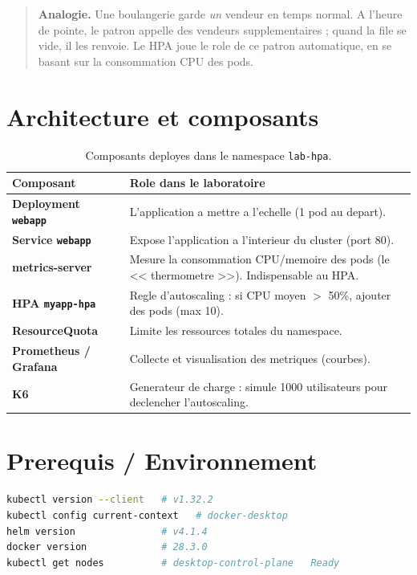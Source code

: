 \documentclass[11pt,a4paper]{report}
\begin{document}
\begin{quote}
\textbf{Analogie.} Une boulangerie garde \emph{un} vendeur en temps normal. A l'heure de
pointe, le patron appelle des vendeurs supplementaires ; quand la file se vide, il les
renvoie. Le HPA joue le role de ce patron automatique, en se basant sur la consommation
CPU des pods.
\end{quote}

\section{Architecture et composants}

\begin{table}[h!]
\centering
\renewcommand{\arraystretch}{1.3}
\begin{tabular}{>{\bfseries}p{3.2cm} p{10.5cm}}
\toprule
Composant & Role dans le laboratoire \\
\midrule
Deployment \texttt{webapp} & L'application a mettre a l'echelle (1 pod au depart). \\
Service \texttt{webapp}    & Expose l'application a l'interieur du cluster (port 80). \\
metrics-server             & Mesure la consommation CPU/memoire des pods (le << thermometre >>). Indispensable au HPA. \\
HPA \texttt{myapp-hpa}     & Regle d'autoscaling : si CPU moyen $>$ 50\%, ajouter des pods (max 10). \\
ResourceQuota              & Limite les ressources totales du namespace. \\
Prometheus / Grafana       & Collecte et visualisation des metriques (courbes). \\
K6                         & Generateur de charge : simule 1000 utilisateurs pour declencher l'autoscaling. \\
\bottomrule
\end{tabular}
\caption{Composants deployes dans le namespace \texttt{lab-hpa}.}
\end{table}

\section{Prerequis / Environnement}

\begin{lstlisting}[language=bash]
kubectl version --client   # v1.32.2
kubectl config current-context   # docker-desktop
helm version               # v4.1.4
docker version             # 28.3.0
kubectl get nodes          # desktop-control-plane   Ready
\end{lstlisting}
\end{document}
